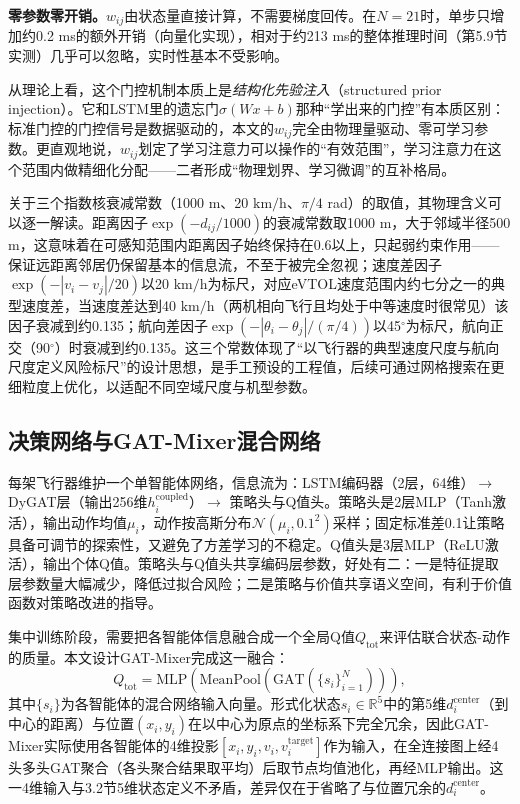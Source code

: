 \documentclass[12pt,a4paper,UTF8]{ctexart}
\begin{document}
\textbf{零参数零开销。}$w_{ij}$由状态量直接计算，不需要梯度回传。在$N=21$时，单步只增加约0.2 ms的额外开销（向量化实现），相对于约213 ms的整体推理时间（第5.9节实测）几乎可以忽略，实时性基本不受影响。

从理论上看，这个门控机制本质上是\emph{结构化先验注入}（structured prior injection）。它和LSTM里的遗忘门$\sigma(Wx+b)$那种“学出来的门控”有本质区别：标准门控的门控信号是数据驱动的，本文的$w_{ij}$完全由物理量驱动、零可学习参数。更直观地说，$w_{ij}$划定了学习注意力可以操作的“有效范围”，学习注意力在这个范围内做精细化分配——二者形成“物理划界、学习微调”的互补格局。

关于三个指数核衰减常数（1000 m、20 $\mathrm{km/h}$、$\pi/4$ rad）的取值，其物理含义可以逐一解读。距离因子$\exp(-d_{ij}/1000)$的衰减常数取1000 m，大于邻域半径500 m，这意味着在可感知范围内距离因子始终保持在0.6以上，只起弱约束作用——保证远距离邻居仍保留基本的信息流，不至于被完全忽视；速度差因子$\exp(-|v_i-v_j|/20)$以20 $\mathrm{km/h}$为标尺，对应eVTOL速度范围内约七分之一的典型速度差，当速度差达到40 $\mathrm{km/h}$（两机相向飞行且均处于中等速度时很常见）该因子衰减到约0.135；航向差因子$\exp(-|\theta_i-\theta_j|/(\pi/4))$以45$^{\circ}$为标尺，航向正交（90$^{\circ}$）时衰减到约0.135。这三个常数体现了“以飞行器的典型速度尺度与航向尺度定义风险标尺”的设计思想，是手工预设的工程值，后续可通过网格搜索在更细粒度上优化，以适配不同空域尺度与机型参数。

\subsection{决策网络与GAT-Mixer混合网络}

每架飞行器维护一个单智能体网络，信息流为：LSTM编码器（2层，64维）$\to$ DyGAT层（输出256维$h_i^{\text{coupled}}$）$\to$ 策略头与Q值头。策略头是2层MLP（Tanh激活），输出动作均值$\mu_i$，动作按高斯分布$\mathcal{N}(\mu_i, 0.1^2)$采样；固定标准差0.1让策略具备可调节的探索性，又避免了方差学习的不稳定。Q值头是3层MLP（ReLU激活），输出个体Q值。策略头与Q值头共享编码层参数，好处有二：一是特征提取层参数量大幅减少，降低过拟合风险；二是策略与价值共享语义空间，有利于价值函数对策略改进的指导。

集中训练阶段，需要把各智能体信息融合成一个全局Q值$Q_{\text{tot}}$来评估联合状态-动作的质量。本文设计GAT-Mixer完成这一融合：
\begin{equation}
    Q_{\text{tot}} = \text{MLP}\!\left(\text{MeanPool}\!\left(\text{GAT}\left(\{s_i\}_{i=1}^{N}\right)\right)\right),
    \label{eq:gat_mixer}
\end{equation}
其中$\{s_i\}$为各智能体的混合网络输入向量。形式化状态$s_i\in\mathbb{R}^5$中的第5维$d_i^{\text{center}}$（到中心的距离）与位置$(x_i,y_i)$在以中心为原点的坐标系下完全冗余，因此GAT-Mixer实际使用各智能体的4维投影$[x_i,y_i,v_i,v_i^{\text{target}}]$作为输入，在全连接图上经4头多头GAT聚合（各头聚合结果取平均）后取节点均值池化，再经MLP输出。这一4维输入与3.2节5维状态定义不矛盾，差异仅在于省略了与位置冗余的$d_i^{\text{center}}$。
\end{document}
